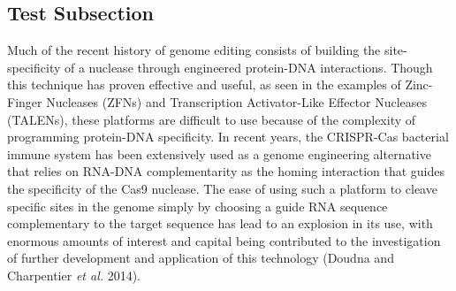 \documentclass{Dissertate}
\begin{document}
\subsection{Test Subsection}
Much of the recent history of genome editing consists of building the site-specificity of a nuclease through engineered protein-DNA interactions. Though this technique has proven effective and useful, as seen in the examples of Zinc-Finger Nucleases (ZFNs) and Transcription Activator-Like Effector Nucleases (TALENs), these platforms are difficult to use because of the complexity of programming protein-DNA specificity.
In recent years, the CRISPR-Cas bacterial immune system has been extensively used as a genome engineering alternative that relies on RNA-DNA complementarity as the homing interaction that guides the specificity of the Cas9 nuclease. The ease of using such a platform to cleave specific sites in the genome simply by choosing a guide RNA sequence complementary to the target sequence has lead to an explosion in its use, with enormous amounts of interest and capital being contributed to the investigation of further development and application of this technology (Doudna and Charpentier \textit{et al.} 2014).

%
%
%
%
%
%    
%
%
\clearpage



%
\end{document}
